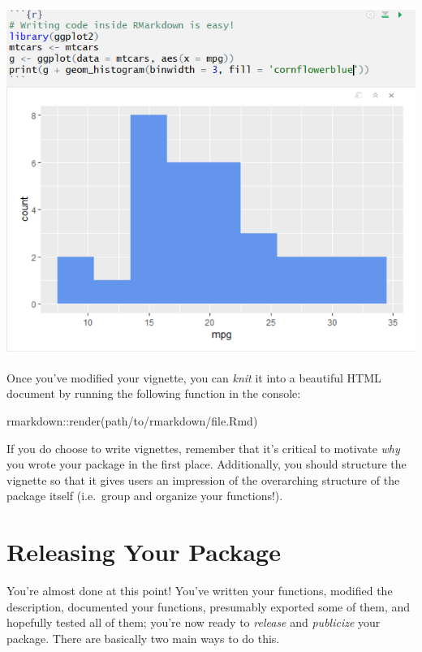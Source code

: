 \documentclass[
]{book}
\newenvironment{Shaded}{\begin{snugshade}}{\end{snugshade}}
\newcommand{\FunctionTok}[1]{\textcolor[rgb]{0.00,0.00,0.00}{#1}}
\newcommand{\NormalTok}[1]{#1}
\newcommand{\SpecialCharTok}[1]{\textcolor[rgb]{0.00,0.00,0.00}{#1}}
\newcommand{\StringTok}[1]{\textcolor[rgb]{0.31,0.60,0.02}{#1}}
\begin{document}
\includegraphics{images/packageSS/vignettecode.PNG}

Once you've modified your vignette, you can \emph{knit} it into a beautiful HTML document by running the following function in the console:

\begin{Shaded}
\begin{Highlighting}[]
\NormalTok{rmarkdown}\SpecialCharTok{::}\FunctionTok{render}\NormalTok{(}\StringTok{\textquotesingle{}path/to/rmarkdown/file.Rmd\textquotesingle{}}\NormalTok{)}
\end{Highlighting}
\end{Shaded}

If you do choose to write vignettes, remember that it's critical to motivate \emph{why} you wrote your package in the first place. Additionally, you should structure the vignette so that it gives users an impression of the overarching structure of the package itself (i.e.~group and organize your functions!).

\hypertarget{releasing-your-package}{%
\section{Releasing Your Package}\label{releasing-your-package}}

You're almost done at this point! You've written your functions, modified the description, documented your functions, presumably exported some of them, and hopefully tested all of them; you're now ready to \emph{release} and \emph{publicize} your package. There are basically two main ways to do this.
\end{document}
